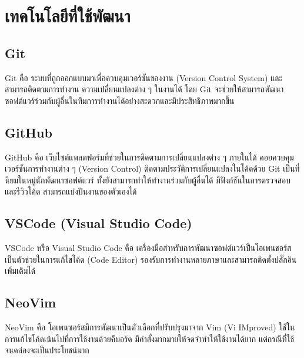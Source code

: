 \newpage

\section{เทคโนโลยีที่ใช้พัฒนา}

\subsection{Git}

Git คือ ระบบที่ถูกออกแบบมาเพื่อควบคุมเวอร์ชันของงาน (Version Control System) และสามารถติดตามการทำงาน ความเปลี่ยนแปลงต่าง ๆ ในงานได้ โดย Git จะช่วยให้สามารถพัฒนาซอฟต์แวร์ร่วมกับผู้อื่นในทีมการทำงานได้อย่างสะดวกและมีประสิทธิภาพมากขึ้น \cite{BasicGit}


\subsection{GitHub}

GitHub คือ เว็บไซต์แพลตฟอร์มที่ช่วยในการติดตามการเปลี่ยนแปลงต่าง ๆ ภายในได้ คอยควบคุมเวอร์ชันการทำงานต่าง ๆ (Version Control) ติดตามประวัติการเปลี่ยนแปลงในโค้ดด้วย Git เป็นที่นิยมในหมู่นักพัฒนาซอฟต์แวร์ ทั้งยังสามารถทำให้ทำงานร่วมกับผู้อื่นได้ มีฟังก์ชันในการตรวจสอบและรีวิวโค้ด สามารถแบ่งปันงานของตัวเองได้ \cite{VCSGitHub}


\subsection{VSCode (Visual Studio Code)}

VSCode หรือ Visual Studio Code คือ เครื่องมือสำหรับการพัฒนาซอฟต์แวร์เป็นโอเพนชอร์สเป็นตัวช่วยในการแก้ไขโค้ด (Code Editor) รองรับการทำงานหลายภาษาและสามารถติดตั้งปลั๊กอินเพิ่มเติมได้ \cite{KnowVSCode}


\subsection{NeoVim}

NeoVim คือ โอเพนซอร์สมีการพัฒนาเป็นตัวเลือกที่ปรับปรุงมาจาก Vim (Vi IMproved) ใช้ในการแก้ไขโค้ดเน้นไปที่การใช้งานด้วยคีบอร์ด มีคำสั่งมากมายให้จดจำทำให้ใช้งานได้ยาก แต่กรณีที่ใช้จนคล่องจะเป็นประโยชน์มาก


\newpage


